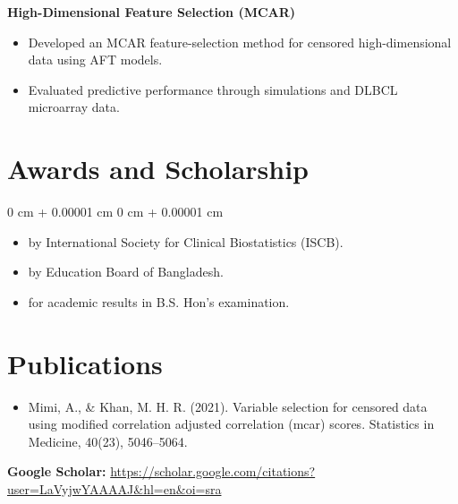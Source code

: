 \documentclass[10pt, letterpaper]{article}
\newenvironment{highlights}{
    \begin{itemize}[
        topsep=0.10 cm,
        parsep=0.10 cm,
        partopsep=0pt,
        itemsep=0pt,
        leftmargin=0 cm + 10pt
    ]
}{
    \end{itemize}
} %
\newenvironment{onecolentry}{
    \begin{adjustwidth}{
        0 cm + 0.00001 cm
    }{
        0 cm + 0.00001 cm
    }
}{
    \end{adjustwidth}
} %
\begin{document}
    \textbf{High-Dimensional Feature Selection (MCAR)} \\
    \begin{itemize}
    \item Developed an MCAR feature-selection method for censored high-dimensional data using AFT models.
    \item Evaluated predictive performance through simulations and DLBCL microarray data.
\end{itemize}

     \vspace{0.2 cm}
    \section{Awards and Scholarship}
        \vspace{0.10 cm}
        \begin{onecolentry}
            \begin{highlights}
                \item {} by International Society for Clinical Biostatistics (ISCB). %
                \item {} by Education Board of Bangladesh. %
                \item {} for academic results in B.S. Hon’s examination.
            \end{highlights}
        \end{onecolentry}


    \section{Publications}
        
        \begin{samepage}
        \begin{itemize}
            \item Mimi, A., \& Khan, M. H. R. (2021). Variable selection for censored data using modified correlation adjusted correlation (mcar) scores. Statistics in Medicine, 40(23), 5046–5064.     
           

        \end{itemize}
        \textbf{Google Scholar:} \href{https://scholar.google.com/citations?user=LaVyjwYAAAAJ&hl=en&oi=sra}{https://scholar.google.com/citations?user=LaVyjwYAAAAJ\&hl=en\&oi=sra}
         \end{samepage}
\end{document}
